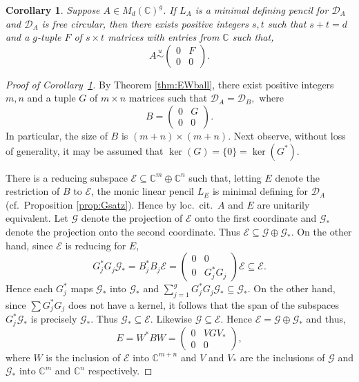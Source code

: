 \documentclass[12pt,makeidx]{amsart}
\renewcommand{\subset}{\subseteq}
\newcommand{\simu}{\stackrel u{\sim}}
\newtheorem{cor}[theorem]{Corollary}
\numberwithin{equation}{section}
\def\cD{ {{\mathcal D}}}
\def\F{\mathbb{C}}
\def\cD{ {\mathcal D} }
\begin{document}
\begin{cor}
 \label{cor:mainball}
  Suppose $A\in M_d(\F)^g$.   If $L_A$ is a minimal defining pencil for $\cD_A$ and $\cD_A$ is free circular, then there exists positive integers $s,t$ such that $s+t=d$ and a $g$-tuple $F$ of $s\times t$  matrices with entries from $\F$ such that, 
\[
 A \simu \begin{pmatrix} 0 & F \\ 0 & 0 \end{pmatrix}.
\]
\end{cor}


\begin{proof}[Proof of Corollary~\ref{cor:mainball}]
 By Theorem \ref{thm:EWball}, there exist positive integers $m,n$ and a tuple $G$ of $m\times n$ matrices  such that $\cD_A=\cD_B,$ where
\[
 B =\begin{pmatrix}0& G\\ 0& 0\end{pmatrix}.
\]
 In particular, the size of $B$ is $(m+n)\times (m+n)$.  Next observe,  without loss of generality, it may be assumed that $\ker(G)=\{0\}=\ker(G^*)$. 

There is a reducing subspace $\mathcal E\subset \F^m\oplus \F^n$ such that, letting $E$ denote the restriction of $B$ to $\mathcal E$, the monic linear pencil $L_E$ is minimal defining for $\cD_A$ 
(cf.~Proposition \ref{prop:Gsatz}).
   Hence by loc.~cit.~$A$ and $E$ are unitarily equivalent.  Let $\mathcal G$ denote the projection of $\mathcal E$ onto the first coordinate and $\mathcal G_*$ denote the projection onto the second coordinate. Thus $\mathcal E\subset \mathcal G\oplus \mathcal G_*$. On the other hand, since $\mathcal E$ is reducing for $E$,
\[
 G_j^* G_j \mathcal G_* =  B_j^* B_j \mathcal E = \begin{pmatrix} 0 & 0 \\ 0 & G_j^* G_j \end{pmatrix} \mathcal E   \subset \mathcal E.
\]
 Hence each $G_j^*$ maps $\mathcal G_*$ into $\mathcal G_*$ and  $\sum_{j=1}^g G_j^* G_j \mathcal G_* \subset \mathcal G_*$. On the other hand, since $\sum G_j^* G_j$ does not have a kernel, it follows that the span of the subspaces $G_j^* \mathcal G_*$ is precisely $\mathcal G_*$.  Thus $\mathcal G_*\subset \mathcal E$. Likewise $\mathcal G\subset \mathcal E$. Hence $\mathcal E =\mathcal G\oplus \mathcal G_*$ and thus,
\[
  E = W^* B W = \begin{pmatrix} 0 & VGV_* \\ 0 & 0 \end{pmatrix},
\]
 where $W$ is the inclusion of $\mathcal E$ into $\F^{m+n}$ and $V$ and $V_*$ are the inclusions of $\mathcal G$ and $\mathcal G_*$ into $\F^m$ and $\F^n$ respectively.
 \end{proof}
\end{document}
